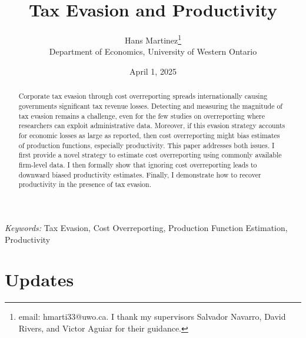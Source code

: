 \documentclass[
  12pt]{article}
\theoremstyle{definition}
\theoremstyle{remark}
\begin{document}
\def\spacingset#1{\renewcommand{\baselinestretch}%
{#1}\small\normalsize} \spacingset{1}



\date{April 1, 2025}
\title{\bf Tax Evasion and Productivity}
\author{
Hans Martinez\thanks{email: hmarti33@uwo.ca. I thank my supervisors
Salvador Navarro, David Rivers, and Victor Aguiar for their guidance.}\\
Department of Economics, University of Western Ontario\\
}
\maketitle

\bigskip
\bigskip
\begin{abstract}
Corporate tax evasion through cost overreporting spreads internationally
causing governments significant tax revenue losses. Detecting and
measuring the magnitude of tax evasion remains a challenge, even for the
few studies on overreporting where researchers can exploit
administrative data. Moreover, if this evasion strategy accounts for
economic losses as large as reported, then cost overreporting might bias
estimates of production functions, especially productivity. This paper
addresses both issues. I first provide a novel strategy to estimate cost
overreporting using commonly available firm-level data. I then formally
show that ignoring cost overreporting leads to downward biased
productivity estimates. Finally, I demonstrate how to recover
productivity in the presence of tax evasion.
\end{abstract}

\noindent%
{\it Keywords:} Tax Evasion, Cost Overreporting, Production Function
Estimation, Productivity
\vfill

\newpage
\spacingset{1.9} %

\section*{Updates}\label{updates}
\end{document}
